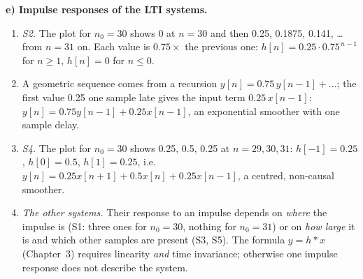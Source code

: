 \begin{solution}
\textbf{e) Impulse responses of the LTI systems.}
\begin{enumerate}[label=Step \arabic*:,leftmargin=*,itemsep=1pt]
  \item \emph{S2.} The plot for $n_0=30$ shows 0 at $n=30$ and then 0.25,
    0.1875, 0.141, \dots{} from $n=31$ on. Each value is $0.75\times$ the
    previous one: $h[n]=0.25\cdot0.75^{\,n-1}$ for $n\ge1$, $h[n]=0$ for
    $n\le0$.
  \item A geometric sequence comes from a recursion
    $y[n]=0.75\,y[n-1]+\dots$; the first value 0.25 one sample late gives the
    input term $0.25\,x[n-1]$: $y[n]=0.75y[n-1]+0.25x[n-1]$, an exponential
    smoother with one sample delay.
  \item \emph{S4.} The plot for $n_0=30$ shows 0.25, 0.5, 0.25 at $n=29,30,31$:
    $h[-1]=0.25$, $h[0]=0.5$, $h[1]=0.25$, i.e.\
    $y[n]=0.25x[n+1]+0.5x[n]+0.25x[n-1]$, a centred, non-causal smoother.
  \item \emph{The other systems.} Their response to an impulse depends on
    \emph{where} the impulse is (S1: three ones for $n_0=30$, nothing for
    $n_0=31$) or on \emph{how large} it is and which other samples are present
    (S3, S5). The formula $y=h*x$ (Chapter~3) requires linearity \emph{and}
    time invariance; otherwise one impulse response does not describe the
    system.
\end{enumerate}
\end{solution}


